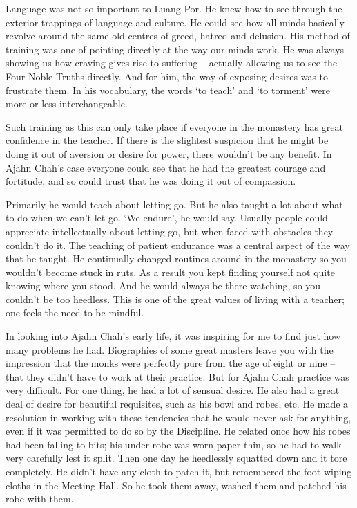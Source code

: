 Language was not so important to Luang Por. He knew how to see through
the exterior trappings of language and culture. He could see how all
minds basically revolve around the same old centres of greed, hatred and
delusion. His method of training was one of pointing directly at the way
our minds work. He was always showing us how craving gives rise to
suffering -- actually allowing us to see the Four Noble Truths directly. 
And for him, the way of exposing desires was to frustrate them. In his
vocabulary, the words `to teach' and `to torment' were more or less
interchangeable. 

Such training as this can only take place if everyone in the monastery
has great confidence in the teacher. If there is the slightest suspicion
that he might be doing it out of aversion or desire for power, there
wouldn't be any benefit. In Ajahn Chah's case everyone could see that he
had the greatest courage and fortitude, and so could trust that he was
doing it out of compassion. 

Primarily he would teach about letting go. But he also taught a lot
about what to do when we can't let go. `We endure', he would say. 
Usually people could appreciate intellectually about letting go, but
when faced with obstacles they couldn't do it. The teaching of patient
endurance was a central aspect of the way that he taught. He continually
changed routines around in the monastery so you wouldn't become stuck in
ruts. As a result you kept finding yourself not quite knowing where you
stood. And he would always be there watching, so you couldn't be too
heedless. This is one of the great values of living with a teacher; one
feels the need to be mindful. 

In looking into Ajahn Chah's early life, it was inspiring for me to find
just how many problems he had. Biographies of some great masters leave
you with the impression that the monks were perfectly pure from the age
of eight or nine -- that they didn't have to work at their practice. But
for Ajahn Chah practice was very difficult. For one thing, he had a lot
of sensual desire. He also had a great deal of desire for beautiful
requisites, such as his bowl and robes, etc. He made a resolution in
working with these tendencies that he would never ask for anything, even
if it was permitted to do so by the Discipline. He related once how his
robes had been falling to bits; his under-robe was worn paper-thin, so
he had to walk very carefully lest it split. Then one day he heedlessly
squatted down and it tore completely. He didn't have any cloth to patch
it, but remembered the foot-wiping cloths in the Meeting Hall. So he
took them away, washed them and patched his robe with them. 

